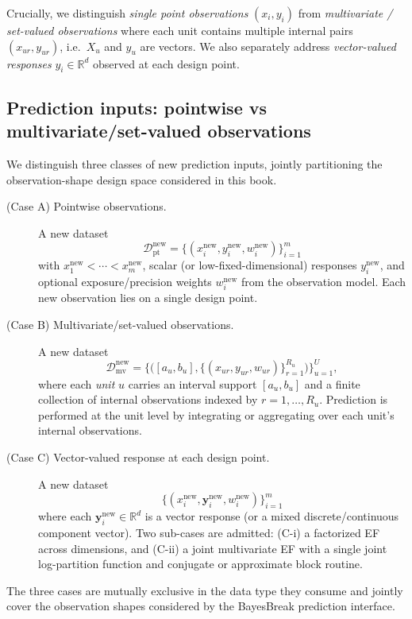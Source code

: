 Crucially, we distinguish \emph{single point observations} $(x_i,y_i)$ from
\emph{multivariate / set-valued observations} where each unit contains multiple internal
pairs $(x_{u r},y_{u r})$, i.e.\ $X_u$ and $y_u$ are vectors. We also separately address
\emph{vector-valued responses} $y_i\in\mathbb{R}^d$ observed at each design point.

\subsection{Prediction inputs: pointwise vs multivariate/set-valued observations}
\label{sec:prediction-inputs}

\begin{definition}
\label{def:prediction-cases}
We distinguish three classes of new prediction inputs, jointly partitioning the
observation-shape design space considered in this book.
\begin{description}
\item[\textnormal{(Case A)} Pointwise observations.] A new dataset
\[
\mathcal{D}^{\mathrm{new}}_{\mathrm{pt}}
= \{(x_i^{\mathrm{new}}, y_i^{\mathrm{new}}, w_i^{\mathrm{new}})\}_{i=1}^m
\]
with $x_1^{\mathrm{new}}<\cdots<x_m^{\mathrm{new}}$, scalar (or low-fixed-dimensional)
responses $y_i^{\mathrm{new}}$, and optional exposure/precision weights
$w_i^{\mathrm{new}}$ from the observation model. Each new observation lies on a single
design point.
\item[\textnormal{(Case B)} Multivariate/set-valued observations.] A new dataset
\[
\mathcal{D}^{\mathrm{new}}_{\mathrm{mv}}
= \Big\{\big([a_u,b_u],\{(x_{ur},y_{ur},w_{ur})\}_{r=1}^{R_u}\big)\Big\}_{u=1}^U,
\]
where each \emph{unit} $u$ carries an interval support $[a_u,b_u]$ and a finite collection of
internal observations indexed by $r=1,\dots,R_u$. Prediction is performed at the unit level by
integrating or aggregating over each unit's internal observations.
\item[\textnormal{(Case C)} Vector-valued response at each design point.] A new dataset
\[
\{(x_i^{\mathrm{new}}, \mathbf{y}_i^{\mathrm{new}}, w_i^{\mathrm{new}})\}_{i=1}^m
\]
where each $\mathbf{y}_i^{\mathrm{new}}\in\mathbb{R}^d$ is a vector response (or a mixed
discrete/continuous component vector). Two sub-cases are admitted: (C-i) a factorized EF
across dimensions, and (C-ii) a joint multivariate EF with a single joint log-partition
function and conjugate or approximate block routine.
\end{description}
The three cases are mutually exclusive in the data type they consume and jointly cover the
observation shapes considered by the BayesBreak prediction interface.
\end{definition}

